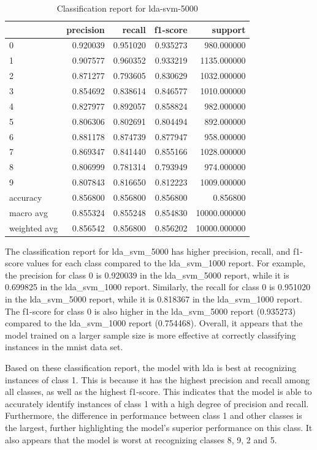 \begin{table}[htb!]
    \centering
    \begin{tabular}{lrrrr}
        \toprule
     & precision & recall & f1-score & support \\
    \midrule
    0 & 0.920039 & 0.951020 & 0.935273 & 980.000000 \\
    1 & 0.907577 & 0.960352 & 0.933219 & 1135.000000 \\
    2 & 0.871277 & 0.793605 & 0.830629 & 1032.000000 \\
    3 & 0.854692 & 0.838614 & 0.846577 & 1010.000000 \\
    4 & 0.827977 & 0.892057 & 0.858824 & 982.000000 \\
    5 & 0.806306 & 0.802691 & 0.804494 & 892.000000 \\
    6 & 0.881178 & 0.874739 & 0.877947 & 958.000000 \\
    7 & 0.869347 & 0.841440 & 0.855166 & 1028.000000 \\
    8 & 0.806999 & 0.781314 & 0.793949 & 974.000000 \\
    9 & 0.807843 & 0.816650 & 0.812223 & 1009.000000 \\
    accuracy & 0.856800 & 0.856800 & 0.856800 & 0.856800 \\
    macro avg & 0.855324 & 0.855248 & 0.854830 & 10000.000000 \\
    weighted avg & 0.856542 & 0.856800 & 0.856202 & 10000.000000 \\
    \bottomrule
\end{tabular}
\caption{Classification report for lda-svm-5000}
\label{tab:classification-report-lda_svm_5000}
\end{table}


The classification report for lda\_svm\_5000 has higher precision, recall, and f1-score values for each class compared to the lda\_svm\_1000 report. For example, the precision for class 0 is 0.920039 in the lda\_svm\_5000 report, while it is 0.699825 in the lda\_svm\_1000 report. Similarly, the recall for class 0 is 0.951020 in the lda\_svm\_5000 report, while it is 0.818367 in the lda\_svm\_1000 report. The f1-score for class 0 is also higher in the lda\_svm\_5000 report (0.935273) compared to the lda\_svm\_1000 report (0.754468). Overall, it appears that the model trained on a larger sample size is more effective at correctly classifying instances in the \gls{mnist} data set.

Based on these classification report, the model with \gls{lda} is best at recognizing instances of class 1. This is because it has the highest precision and recall among all classes, as well as the highest f1-score. This indicates that the model is able to accurately identify instances of class 1 with a high degree of precision and recall. Furthermore, the difference in performance between class 1 and other classes is the largest, further highlighting the model's superior performance on this class. It also appears that the model is worst at recognizing classes 8, 9, 2 and 5.

